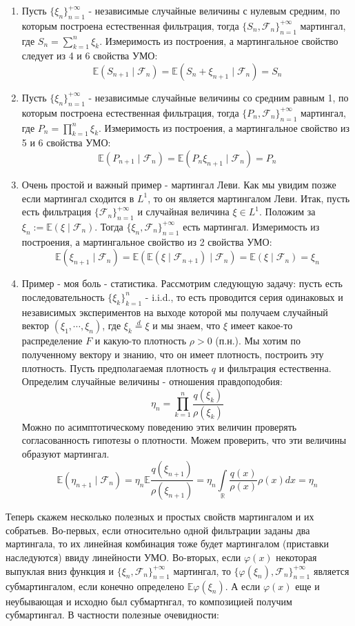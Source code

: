 \documentclass[12pt,a4paper]{article} %
\newcommand{\R}{\mathbb{R}}
\newcommand{\E}{\mathbb{E}}
\newcommand{\F}{\mathcal{F}}
\begin{document}
	\begin{enumerate}
		\item Пусть $\{\xi_n\}_{n=1}^{+\infty}$ - независимые случайные величины с нулевым средним, по которым построена естественная фильтрация, тогда $\{S_n,\F_n\}_{n=1}^{+\infty}$ мартингал, где $S_n=\displaystyle\sum_{k=1}^n\xi_k$. Измеримость из построения, а мартингальное свойство следует из 4 и 6 свойства УМО:
		$$\E(S_{n+1}\mid\F_n)=\E(S_n+\xi_{n+1}\mid\F_n)=S_n$$
		\item Пусть $\{\xi_n\}_{n=1}^{+\infty}$ - независимые случайные величины со средним равным 1, по которым построена естественная фильтрация, тогда $\{P_n,\F_n\}_{n=1}^{+\infty}$ мартингал, где $P_n=\displaystyle\prod_{k=1}^n\xi_k$. Измеримость из построения, а мартингальное свойство из 5 и 6 свойства УМО:
		$$\E(P_{n+1}\mid\F_n)=\E(P_n\xi_{n+1}\mid\F_n)=P_n$$
		\item Очень простой и важный пример - мартингал Леви. Как мы увидим позже если мартингал сходится в $L^1$, то он является мартингалом Леви. Итак, пусть есть фильтрация $\{\F_n\}_{n=1}^{+\infty}$ и случайная величина $\xi\in L^1$. Положим за $\xi_n:=\E(\xi\mid\F_n)$. Тогда $\{\xi_n,\F_n\}_{n=1}^{+\infty}$ есть мартингал. Измеримость из построения, а мартингальное свойство из 2 свойства УМО:
		$$\E(\xi_{n+1}\mid\F_n)=\E(\E(\xi\mid\F_{n+1})\mid\F_n)=\E(\xi\mid\F_n)=\xi_n$$
		\item Пример - моя боль - статистика. Рассмотрим следующую задачу: пусть есть последовательность $\{\xi_k\}_{k=1}^n$ - i.i.d., то есть проводится серия одинаковых и независимых экспериментов на выходе которой мы получаем случайный вектор $(\xi_1,\cdots,\xi_n)$, где $\xi_k\overset{d}{=}\xi$ и мы знаем, что $\xi$ имеет какое-то распределение $F$ и какую-то плотность $\rho>0$ (п.н.). Мы хотим по полученному вектору и знанию, что он имеет плотность, построить эту плотность. Пусть предполагаемая плотность $q$ и фильтрация естественна. Определим случайные величины - отношения правдоподобия:
		$$\eta_n=\prod_{k=1}^n\frac{q(\xi_k)}{\rho(\xi_k)}$$
		Можно по асимптотическому поведению этих величин проверять согласованность гипотезы о плотности. Можем проверить, что эти величины образуют мартингал.
		$$\E(\eta_{n+1}\mid\F_n)=\eta_n\E\frac{q(\xi_{n+1})}{\rho(\xi_{n+1})}=\eta_n\int\limits_{\R}\frac{q(x)}{\rho(x)}\rho(x)dx=\eta_n$$
	\end{enumerate}
	Теперь скажем несколько полезных и простых свойств мартингалом и их собратьев. Во-первых, если относительно одной фильтрации заданы два мартингала, то их линейная комбинация тоже будет мартингалом (приставки наследуются) ввиду линейности УМО. Во-вторых, если $\varphi(x)$ некоторая выпуклая вниз функция и $\{\xi_n,\F_n\}_{n=1}^{+\infty}$ мартингал, то $\{\varphi(\xi_n),\F_n\}_{n=1}^{+\infty}$ является субмартингалом, если конечно определено $\E\varphi(\xi_n)$. А если $\varphi(x)$ еще и неубывающая и исходно был субмартнгал, то композицией получим субмартингал. В частности полезные очевидности:
\end{document}
